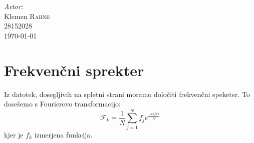 \documentclass[slovene,11pt,a4paper]{article}
\numberwithin{equation}{section} %
\numberwithin{figure}{section} %
\numberwithin{table}{section} %
\begin{document}
\begin{titlepage}



\Large \emph{Avtor:}\\
Klemen \textsc{Rahne}\\
28152028\\[2cm]

{\large \today } \\[0.5cm] %

	

\end{titlepage}






\section{Frekvenčni sprekter}
Iz datotek, dosegljivih na spletni strani moramo določiti frekvenčni speketer. To dosešemo s Fourierovo transformacijo:
\begin{equation}
\mathcal{F}_k= \frac{1}{N} \sum_{j=1}^N f_j e^{\frac{- ik j 2\pi}{N}}
\end{equation}
kjer je $f_k$ izmerjena funkcija.
\end{document}
